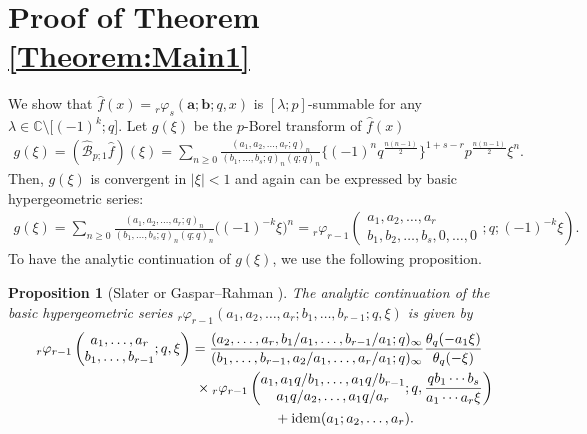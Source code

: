 \documentclass[pdftex]{sigma}
\numberwithin{equation}{section}
\newtheorem{Proposition}[Theorem]{Proposition}
\newcommand{\idem}{{\rm idem}}
\begin{document}
\section{Proof of Theorem \ref{Theorem:Main1}}\label{Section:Proof_Main1}
We show that $\hat{f}(x)={}_r\varphi_s(\bm{a};\bm{b};q,x)$ is $[\lambda;p]$-summable for any $\lambda\in\mathbb{C}\setminus\big[(-1)^k;q\big]$. Let $g(\xi)$ be the $p$-Borel transform of $\hat{f}(x)$
\begin{gather*}
g(\xi)=(\hat{\mathcal{B}}_{p;1}\hat{f})(\xi)=\sum_{n\ge0}\frac{(a_1,a_2,\ldots,a_r;q)_n}{(b_1,\ldots,b_s;q)_n(q;q)_n}\big\{(-1)^nq^{\frac{n(n-1)}{2}}\big\}^{1+s-r}p^{\frac{n(n-1)}{2}}\xi^n.
\end{gather*}
Then, $g(\xi)$ is convergent in $|\xi|<1$ and again can be expressed by basic hypergeometric series:
\begin{gather*}
g(\xi)=\sum_{n\ge0}\frac{(a_1,a_2,\ldots,a_r;q)_n}{(b_1,\ldots,b_s;q)_n(q;q)_n}\big((-1)^{-k}\xi\big)^n={}_r\varphi_{r-1}\left(
\begin{matrix}
a_1,a_2,\ldots,a_r\\
b_1,b_2,\ldots,b_s,0,\ldots,0
\end{matrix}
;q;(-1)^{-k}\xi
\right).
\end{gather*}
To have the analytic continuation of $g(\xi)$, we use the following proposition.
\begin{Proposition}[Slater \cite{Slater1952} or Gaspar--Rahman {\cite[Section~4.5]{Gasper&Rahman2004}}] The analytic continuation of the basic hypergeometric series ${}_r\varphi_{r-1}(a_1,a_2,\ldots,a_r;b_1,\ldots,b_{r-1};q,\xi)$ is given by
\begin{gather}
{}_r\varphi_{r-1}\left(
\begin{matrix}a_1,\ldots,a_r\\
b_1,\ldots,b_{r-1}
\end{matrix};q,\xi\right)=\frac{(a_2,\ldots,a_r,b_1/a_1,\ldots,b_{r-1}/a_1;q)_\infty}{(b_1,\ldots,b_{r-1},a_2/a_1,\ldots,a_r/a_1;q)_\infty}\frac{\theta_q(-a_1\xi)}{\theta_q(-\xi)}\nonumber\\
\hphantom{{}_r\varphi_{r-1}\left(
\begin{matrix}a_1,\ldots,a_r\\
b_1,\ldots,b_{r-1}
\end{matrix};q,\xi\right)=}{} \times{}_r\varphi_{r-1}\left(
\begin{matrix}a_1,a_1q/b_1,\ldots,a_1q/b_{r-1}\\
a_1q/a_2,\ldots,a_1q/a_r
\end{matrix};q,\frac{qb_1\cdots b_{s}}{a_1\cdots a_r\xi }\right)\nonumber\\
\hphantom{{}_r\varphi_{r-1}\left(
\begin{matrix}a_1,\ldots,a_r\\
b_1,\ldots,b_{r-1}
\end{matrix};q,\xi\right)=}{} +\idem(a_1;a_2,\ldots,a_r).\label{r,r-1AC}
\end{gather}
\end{Proposition}
\end{document}
